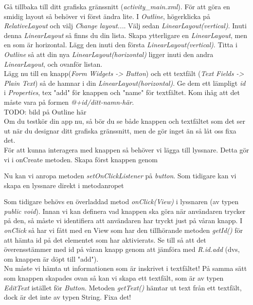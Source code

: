 \documentclass[11 pt, titlepage]{article} %
\begin{document}
Gå tillbaka till ditt grafiska gränssnitt (\textit{activity\_main.xml}). För att göra en smidig layout så behöver vi först ändra lite. I \textit{Outline}, högerklicka på \textit{RelativeLayout} och välj \textit{Change layout...}. Välj sedan \textit{LinearLayout(vertical)}. Inuti denna \textit{LinearLayout} så finns du din lista. Skapa ytterligare en \textit{LinearLayout}, men en som är horizontal. Lägg den inuti den första \textit{LinearLayout(vertical)}. Titta i \textit{Outline} så att din nya \textit{LinearLayout(horizontal)} ligger inuti den andra \textit{LinearLayout}, och ovanför listan.\\

Lägg nu till en knapp(\textit{Form Widgets -> Button}) och ett textfält (\textit{Text Fields -> Plain Text}) så de hamnar i din \textit{LinearLayout(horizontal)}. Ge dem ett lämpligt \textit{id} i \textit{Properties}, tex "add" för knappen och "name" för textfältet. Kom ihåg att det måste vara på formen \textit{@+id/ditt-namn-här}.\\

TODO: bild på Outline här\\

Om du testkör din app nu, så bör du se både knappen och textfältet som det ser ut när du designar ditt grafiska gränssnitt, men de gör inget än så låt oss fixa det. \\

För att kunna interagera med knappen så behöver vi lägga till lyssnare. Detta gör vi i onCreate metoden.
Skapa först knappen genom 

Nu kan vi anropa metoden \textit{setOnClickListener} på \textit{button}. Som tidigare kan vi skapa en lyssnare direkt i metodanropet


Som tidigare behövs en överladdad metod \textit{onClick(View)} i lyssnaren (av typen \textit{public void}). Innan vi kan definera vad knappen ska göra när användaren trycker på den, så måste vi identifiera att användaren har tryckt just på våran knapp.
I \textit{onClick} så har vi fått med en View som har den tillhörande metoden \textit{getId()} för att hämta id på det elementet som har aktivierats. Se till så att det överensstämmer med id på våran knapp genom att jämföra med \textit{R.id.add} (dvs, om knappen är döpt till "add").\\

Nu måste vi hämta ut informationen som är inskrivet i textfältet! På samma sätt som knappen skapades ovan så kan vi skapa ett textfält, som är av typen \textit{EditText} istället för \textit{Button}.
Metoden \textit{getText()} hämtar ut text från ett textfält, dock är det inte av typen String. Fixa det!\\
\end{document}
